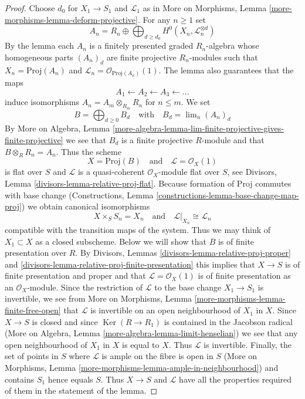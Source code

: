 \documentclass{stacks-project}
\theoremstyle{plain}
\theoremstyle{definition}
\theoremstyle{remark}
\numberwithin{equation}{subsection}
\def\lim{\mathop{\mathrm{lim}}\nolimits}
\def\Ker{\mathop{\mathrm{Ker}}}
\begin{document}
\begin{proof}
Choose $d_0$ for $X_1 \to S_1$ and $\mathcal{L}_1$ as in
More on Morphisms, Lemma \ref{more-morphisms-lemma-deform-projective}.
For any $n \geq 1$ set
$$
A_n = R_n \oplus
\bigoplus\nolimits_{d \geq d_0} H^0(X_n, \mathcal{L}_n^{\otimes d})
$$
By the lemma each $A_n$ is a finitely presented graded $R_n$-algebra
whose homogeneous parts $(A_n)_d$ are finite projective $R_n$-modules
such that $X_n = \text{Proj}(A_n)$ and
$\mathcal{L}_n = \mathcal{O}_{\text{Proj}(A_n)}(1)$.
The lemma also guarantees that the maps
$$
A_1 \leftarrow A_2 \leftarrow A_3 \leftarrow \ldots
$$
induce isomorphisms $A_n = A_m \otimes_{R_m} R_n$ for $n \leq m$.
We set
$$
B = \bigoplus\nolimits_{d \geq 0} B_d
\quad\text{with}\quad
B_d = \lim_n (A_n)_d
$$
By More on Algebra, Lemma
\ref{more-algebra-lemma-lim-finite-projective-gives-finite-projective}
we see that $B_d$ is a finite projective $R$-module and that
$B \otimes_R R_n = A_n$. Thus the scheme
$$
X = \text{Proj}(B)
\quad\text{and}\quad
\mathcal{L} = \mathcal{O}_X(1)
$$
is flat over $S$ and $\mathcal{L}$ is a quasi-coherent $\mathcal{O}_X$-module
flat over $S$, see
Divisors, Lemma \ref{divisors-lemma-relative-proj-flat}.
Because formation of Proj commutes with base change
(Constructions, Lemma \ref{constructions-lemma-base-change-map-proj})
we obtain canonical isomorphisms
$$
X \times_S S_n = X_n
\quad\text{and}\quad
\mathcal{L}|_{X_n} \cong \mathcal{L}_n
$$
compatible with the transition maps of the system.
Thus we may think of $X_1 \subset X$ as a closed subscheme.
Below we will show that $B$ is of finite presentation over $R$.
By Divisors, Lemmas \ref{divisors-lemma-relative-proj-proper} and
\ref{divisors-lemma-relative-proj-finite-presentation}
this implies that $X \to S$ is of finite presentation
and proper and that $\mathcal{L} = \mathcal{O}_X(1)$
is of finite presentation as an $\mathcal{O}_X$-module.
Since the restriction of $\mathcal{L}$ to the base change
$X_1 \to S_1$ is invertible, we see from
More on Morphisms, Lemma \ref{more-morphisms-lemma-finite-free-open}
that $\mathcal{L}$ is invertible on an open neighbourhood of $X_1$ in $X$.
Since $X \to S$ is closed and since $\Ker(R \to R_1)$
is contained in the Jacobson radical
(More on Algebra, Lemma \ref{more-algebra-lemma-limit-henselian})
we see that any open neighbourhood of $X_1$ in $X$ is equal to $X$.
Thus $\mathcal{L}$ is invertible. Finally, the set of points in
$S$ where $\mathcal{L}$ is ample on the fibre is open in $S$
(More on Morphisms, Lemma \ref{more-morphisms-lemma-ample-in-neighbourhood})
and contains $S_1$ hence equals $S$. Thus $X \to S$ and $\mathcal{L}$
have all the properties required of them in the statement of the lemma.


\end{proof}
\end{document}
